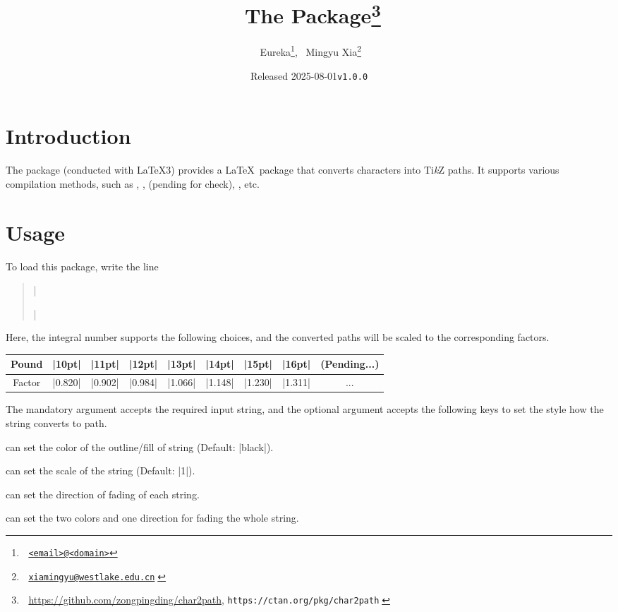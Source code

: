 \documentclass[lm-default]{l3doc}
\title{^^A
  The \pkg{char2path} Package\thanks{^^A
    \url{https://github.com/zongpingding/char2path},
    \texttt{https://ctan.org/pkg/char2path}^^A
  }^^A
}
\author{^^A
  Eureka\thanks{^^A
    \href{mailto:<email>@<domain>}{\texttt{<email>@<domain>}}},~
  Mingyu Xia\thanks{^^A
    \href{mailto:xiamingyu@westlake.edu.cn}{\texttt{xiamingyu@westlake.edu.cn}}^^A
  }^^A
}
\date{Released 2025-08-01\quad \texttt{v1.0.0}}
\begin{document}
\maketitle

\begin{documentation}

\section{Introduction}

The  package (conducted with \LaTeX3) provides
a \LaTeX\ package that converts characters into Ti\textit k\/Z paths.
It supports various compilation methods, such as ,
,  (pending for check), , etc.

\section{Usage}

To load this package, write the line
\begin{quote}
  |\usepackage[scale = ||pt]{char2path}|
\end{quote}

Here, the integral number  supports the following choices,
and the converted paths will be scaled to the corresponding factors.

\begin{center}
  \begin{tabular}{*9c}
    \toprule
    Pound   & |10pt|  & |11pt|  & |12pt|  &
    |13pt|  & |14pt|  & |15pt|  & |16pt|  & (Pending...)\\
    \midrule
    Factor  & |0.820| & |0.902| & |0.984| &
    |1.066| & |1.148| & |1.230| & |1.311| & ...\\
    \bottomrule
  \end{tabular}
\end{center}

\begin{function}{\chartopath}
  \begin{syntax}
      
  \end{syntax}
  The mandatory argument accepts the required input string, and the optional
  argument accepts the following keys to set the style how the string converts
  to path.
  \begin{keyval}
    \item [\key{draw,fill}]  can set the color of the outline/fill of string
    (Default: |black|).
    \item [\key{scale}]  can set the scale of the string
    (Default: |1|).
    \item [\key{path fading}]  can set the direction of
    fading of each string.
    \item [\key{fading}]  can set the two colors and one direction for fading the whole string.
  \end{keyval}
\end{function}


\end{documentation}
\end{document}
